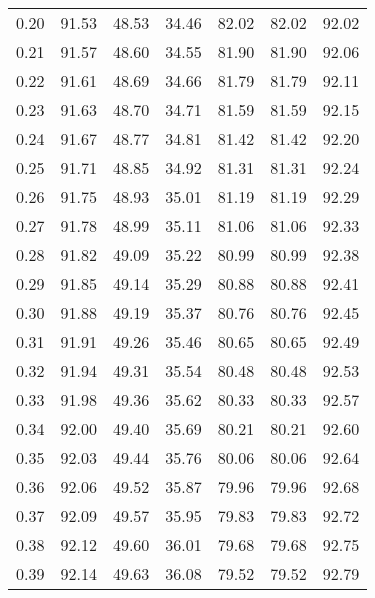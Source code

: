 \begin{tabular}{|c|c|c|c|c|c|c|}
      0.20 &     91.53 &     48.53 &      34.46 &   82.02 &      82.02 &         92.02 \\
      0.21 &     91.57 &     48.60 &      34.55 &   81.90 &      81.90 &         92.06 \\
      0.22 &     91.61 &     48.69 &      34.66 &   81.79 &      81.79 &         92.11 \\
      0.23 &     91.63 &     48.70 &      34.71 &   81.59 &      81.59 &         92.15 \\
      0.24 &     91.67 &     48.77 &      34.81 &   81.42 &      81.42 &         92.20 \\
      0.25 &     91.71 &     48.85 &      34.92 &   81.31 &      81.31 &         92.24 \\
      0.26 &     91.75 &     48.93 &      35.01 &   81.19 &      81.19 &         92.29 \\
      0.27 &     91.78 &     48.99 &      35.11 &   81.06 &      81.06 &         92.33 \\
      0.28 &     91.82 &     49.09 &      35.22 &   80.99 &      80.99 &         92.38 \\
      0.29 &     91.85 &     49.14 &      35.29 &   80.88 &      80.88 &         92.41 \\
      0.30 &     91.88 &     49.19 &      35.37 &   80.76 &      80.76 &         92.45 \\
      0.31 &     91.91 &     49.26 &      35.46 &   80.65 &      80.65 &         92.49 \\
      0.32 &     91.94 &     49.31 &      35.54 &   80.48 &      80.48 &         92.53 \\
      0.33 &     91.98 &     49.36 &      35.62 &   80.33 &      80.33 &         92.57 \\
      0.34 &     92.00 &     49.40 &      35.69 &   80.21 &      80.21 &         92.60 \\
      0.35 &     92.03 &     49.44 &      35.76 &   80.06 &      80.06 &         92.64 \\
      0.36 &     92.06 &     49.52 &      35.87 &   79.96 &      79.96 &         92.68 \\
      0.37 &     92.09 &     49.57 &      35.95 &   79.83 &      79.83 &         92.72 \\
      0.38 &     92.12 &     49.60 &      36.01 &   79.68 &      79.68 &         92.75 \\
      0.39 &     92.14 &     49.63 &      36.08 &   79.52 &      79.52 &         92.79 \\

\end{tabular}
